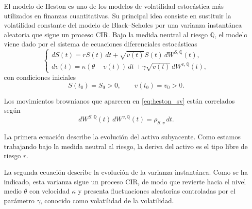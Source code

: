 El modelo de Heston es uno de los modelos de volatilidad estocástica más utilizados en finanzas cuantitativas. Su principal idea consiste en sustituir la volatilidad constante del modelo de Black--Scholes por una varianza instantánea aleatoria que sigue un proceso CIR. Bajo la medida neutral al riesgo $\mathbb{Q}$, el modelo viene dado por el sistema de ecuaciones diferenciales estocásticas
\begin{equation}
\label{eq:heston_sv}
\begin{cases}
dS(t) = rS(t)\,dt+\sqrt{v(t)}S(t)\,dW^{S,\mathbb{Q}}(t), \\[0.15cm]
dv(t) = \kappa(\theta-v(t))\,dt+\gamma\sqrt{v(t)}\,dW^{v,\mathbb{Q}}(t),
\end{cases}
\end{equation}
con condiciones iniciales
\[
S(t_0)=S_0>0,
\qquad
v(t_0)=v_0>0.
\]

Los movimientos brownianos que aparecen en \ref{eq:heston_sv} están correlados según
\begin{equation}
\label{eq:heston_correlation}
dW^{S,\mathbb{Q}}(t)\,dW^{v,\mathbb{Q}}(t)=\rho_{S,v}\,dt.
\end{equation}

La primera ecuación describe la evolución del activo subyacente. Como estamos trabajando bajo la medida neutral al riesgo, la deriva del activo es el tipo libre de riesgo $r$. \medskip

La segunda ecuación describe la evolución de la varianza instantánea. Como se ha indicado, esta varianza sigue un proceso CIR, de modo que revierte hacia el nivel medio \(\theta\) con velocidad \(\kappa\) y presenta fluctuaciones aleatorias controladas por el parámetro \(\gamma\), conocido como volatilidad de la volatilidad. \medskip

